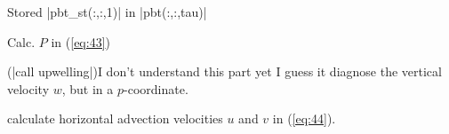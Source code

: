
\been

\item Stored |pbt_st(:,:,1)| in |pbt(:,:,tau)|
\item Calc. $P$ in (\ref{eq:43})
\item (|call upwelling|){\color{red}I don't understand this part yet}
I guess it diagnose the vertical velocity $w$, but in a $p$-coordinate.
\item calculate horizontal advection velocities $u$ and $v$ in (\ref{eq:44}).

\enen


